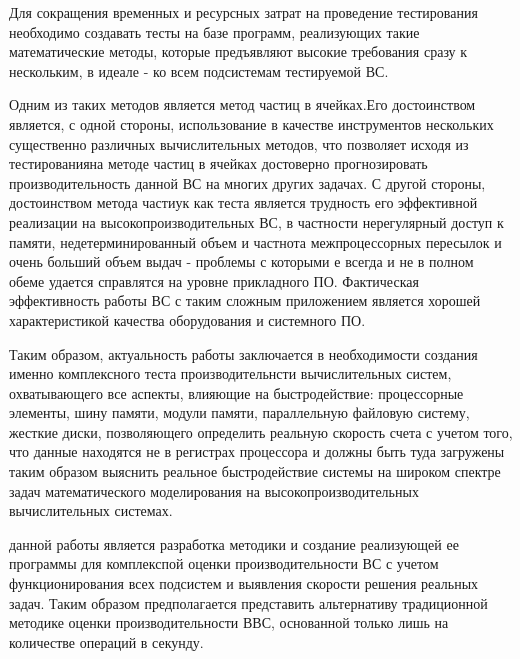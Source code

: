 Для сокращения временных и ресурсных затрат на проведение тестирования необходимо создавать тесты на базе программ, реализующих такие математические методы, которые предъявляют высокие требования сразу к нескольким, в идеале - ко всем подсистемам тестируемой ВС. 

Одним из таких методов является метод частиц в ячейках.Его достоинством является, с одной стороны, использование в качестве инструментов нескольких существенно различных вычислительных методов, что позволяет исходя из тестированияна методе частиц в ячейках достоверно прогнозировать производительность данной ВС на многих других задачах. С другой стороны, достоинством метода частиук как теста является трудность его эффективной реализации на высокопроизводительных ВС, в частности нерегулярный доступ к памяти, недетерминированный объем и частнота межпроцессорных пересылок и очень больший объем выдач - проблемы с которыми е всегда и не в полном обеме удается справлятся на уровне прикладного ПО. Фактическая эффективность работы ВС с таким сложным приложением является хорошей характеристикой качества оборудования и системного ПО.

Таким образом, актуальность работы заключается в необходимости создания именно комплексного теста производительнсти вычислительных систем, охватывающего все аспекты, влияющие на быстродействие: процессорные элементы, шину памяти, модули памяти, параллельную файловую систему, жесткие диски, позволяющего определить  реальную скорость счета с учетом того, что данные находятся не в регистрах процессора и должны быть туда загружены таким образом выяснить реальное быстродействие системы на широком спектре задач математического моделирования на высокопроизводительных вычислительных системах. 


{\aim} данной работы является разработка методики и создание реализующей ее программы для комплекспой оценки производительности ВС с учетом функционирования всех подсистем  и выявления скорости решения реальных задач. Таким образом предполагается представить альтернативу традиционной методике оценки производительности ВВС, основанной только лишь на количестве операций в секунду.  


